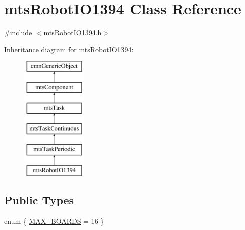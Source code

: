 \hypertarget{classmts_robot_i_o1394}{}\section{mts\+Robot\+I\+O1394 Class Reference}
\label{classmts_robot_i_o1394}


{\ttfamily \#include $<$mts\+Robot\+I\+O1394.\+h$>$}

Inheritance diagram for mts\+Robot\+I\+O1394\+:\begin{figure}[H]
\begin{center}
\leavevmode
\includegraphics[height=6.000000cm]{d3/d42/classmts_robot_i_o1394}
\end{center}
\end{figure}
\subsection*{Public Types}
\begin{DoxyCompactItemize}
\item 
enum \{ \hyperlink{classmts_robot_i_o1394_a6c6b76c5f7e32dfea5db3ef87a4b2c3eae14ba9547603419cc36292983705a60d}{M\+A\+X\+\_\+\+B\+O\+A\+R\+D\+S} = 16
 \}
\end{DoxyCompactItemize}
